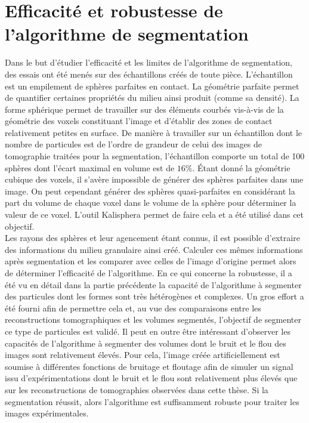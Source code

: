 \graphicspath{{./Annexe_capacites_segm/images/}}

\chapter{Efficacité et robustesse de l'algorithme de segmentation}
\label{annexe:capacites_segm}

Dans le but d'étudier l'efficacité et les limites de l'algorithme de segmentation, des essais ont été menés sur des échantillons créés de toute pièce. L'échantillon est un empilement de sphères parfaites en contact. La géométrie parfaite permet de quantifier certaines propriétés du milieu ainsi produit (comme sa densité). La forme sphérique permet de travailler sur des éléments courbés vis-à-vis de la géométrie des voxels constituant l'image et d'établir des zones de contact relativement petites en surface. De manière à travailler sur un échantillon dont le nombre de particules est de l'ordre de grandeur de celui des images de tomographie traitées pour la segmentation, l'échantillon comporte un total de \num{100} sphères dont l'écart maximal en volume est de $16\%$. \'Etant donné la géométrie cubique des voxels, il s'avère impossible de générer des sphères parfaites dans une image. On peut cependant générer des sphères quasi-parfaites en considérant la part du volume de chaque voxel dans le volume de la sphère pour déterminer la valeur de ce voxel. L'outil Kalisphera \citep{tengattini_kalisphera_2015} permet de faire cela et a été utilisé dans cet objectif.
\\Les rayons des sphères et leur agencement étant connus, il est possible d'extraire des informations du milieu granulaire ainsi créé. Calculer ces mêmes informations après segmentation et les comparer avec celles de l'image d'origine permet alors de déterminer l'efficacité de l'algorithme. En ce qui concerne la robustesse, il a été vu en détail dans la partie précédente la capacité de l'algorithme à segmenter des particules dont les formes sont très hétérogènes et complexes. Un gros effort a été fourni afin de permettre cela et, au vue des comparaisons entre les reconstructions tomographiques et les volumes segmentés, l'objectif de segmenter ce type de particules est validé. Il peut en outre être intéressant d'observer les capacités de l'algorithme à segmenter des volumes dont le bruit et le flou des images sont relativement élevés. Pour cela, l'image créée artificiellement est soumise à différentes fonctions de bruitage et floutage afin de simuler un signal issu d'expérimentations dont le bruit et le flou sont relativement plus élevés que sur les reconstructions de tomographies observées dans cette thèse. Si la segmentation réussit, alors l'algorithme est suffisamment robuste pour traiter les images expérimentales.
